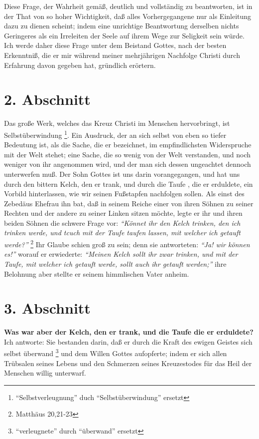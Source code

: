 Diese Frage, der Wahrheit gemäß, deutlich und vollständig zu beantworten, ist in
der That von so hoher Wichtigkeit, daß alles Vorhergegangene nur als Einleitung
dazu zu dienen scheint; indem eine unrichtige Beantwortung derselben nichts
Geringeres als ein Irreleiten der Seele auf ihrem Wege zur Seligkeit sein würde.
Ich werde daher diese Frage unter dem Beistand Gottes, nach der besten
Erkenntniß, die er mir während meiner mehrjährigen Nachfolge Christi durch
Erfahrung davon gegeben hat, gründlich erörtern.

\section{2. Abschnitt} \label{kap4_ab2}

Das große Werk, welches das Kreuz Christi im Menschen hervorbringt, ist
Selbstüberwindung \footnote{"`Selbstverleugnung"' duch "`Selbstüberwindung"' ersetzt}. Ein Ausdruck, der an sich selbst von eben so tiefer Bedeutung
ist, als die Sache, die er bezeichnet, im empfindlichsten Widerspruche mit der
Welt stehet; eine Sache, die so wenig von der Welt verstanden, und noch weniger
von ihr angenommen wird, und der man sich dessen ungeachtet dennoch unterwerfen
muß. Der Sohn Gottes ist uns darin vorangegangen, und hat uns durch den bittern
Kelch, den er trank, und durch die Taufe , die er erduldete, ein Vorbild
hinterlassen, wie wir seinen Fußstapfen nachfolgen sollen. Als einst des
Zebedäus Ehefrau  ihn bat, daß in seinem Reiche einer von ihren Söhnen zu
seiner Rechten und der andere zu seiner Linken sitzen möchte, legte er ihr und
ihren beiden Söhnen die schwere Frage vor:
\textit{"`Könnet ihr den Kelch trinken, den
ich trinken werde, und tcuch mit der Taufe taufen lassen, mit welcher ich
getauft werde?"'}
\footnote{Matthäus  20,21-23}
Ihr Glaube schien groß zu sein; denn
sie antworteten:\textit{ "`Ja! wir können es!"'} worauf er erwiederte:
  \textit{"`Meinen Kelch
sollt ihr zwar trinken, und mit der Taufe, mit welcher ich getauft werde, sollt
auch ihr getauft werden;"'} ihre Belohnung aber stellte er seinem himmlischen
Vater anheim.

\section{3. Abschnitt} \label{kap4_ab3}

 
\textbf{Was war aber der Kelch, den er trank, und die Taufe die er erduldete?} Ich
antworte: Sie bestanden darin, daß er durch die Kraft des ewigen Geistes sich
selbst überwand \footnote{"`verleugnete"' durch "`überwand"' ersetzt} und dem Willen Gottes aufopferte; indem er sich allen
Trübsalen seines Lebens und den Schmerzen seines Kreuzestodes für das Heil der
Menschen willig unterwarf.


